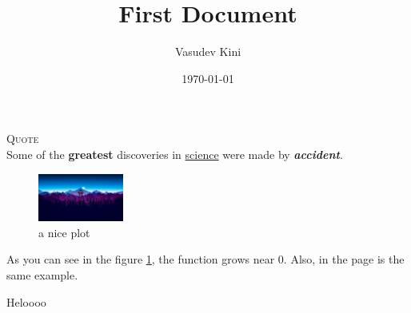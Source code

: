 \documentclass[a4paper,12pt,]{article}
\begin{document}
	
	\title{First Document}
	\author{Vasudev Kini}
	\date{\today}
	\maketitle
	
	\textsc{Quote}  \\ %
	Some of the \textbf{greatest}
	discoveries in \underline{science} 
	were made by \textbf{\textit{accident}}.
	
	\begin{figure}
		\includegraphics[width=0.25\textwidth]{wallaper.jpg}
	 	\centering
		\caption{a nice plot}
		\label{fig:mesh1}
	\end{figure}

	As you can see in the figure \ref{fig:mesh1}, the 
	function grows near 0. Also, in the page \pageref{fig:mesh1} 
	is the same example.
	
	Heloooo
\end{document}
